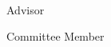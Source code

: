 \thispagestyle{empty}
\begin{center}
    \spacedlowsmallcaps{\myName} \\ \medskip                        

    \begingroup
        \color{Maroon}\spacedallcaps{\myTitle}
    \endgroup
\end{center}        

\begin{flushright}
  Advisor\hspace{0.5cm}          \makebox[3in]{\hrulefill}
  
  Committee Member\hspace{0.5cm} \makebox[3in]{\hrulefill}
\end{flushright}


